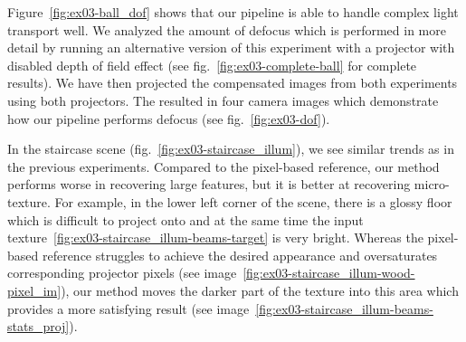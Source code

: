 Figure~\ref{fig:ex03-ball_dof} shows that our pipeline is able to handle complex light transport well. We analyzed the amount of defocus which is performed in more detail by running an alternative version of this experiment with a projector with disabled depth of field effect (see fig.~\ref{fig:ex03-complete-ball} for complete results). We have then projected the compensated images from both experiments using both projectors. The resulted in four camera images which demonstrate how our pipeline performs defocus (see fig.~\ref{fig:ex03-dof}).

In the staircase scene (fig.~\ref{fig:ex03-staircase_illum}), we see similar trends as in the previous experiments. Compared to the pixel-based reference, our method performs worse in recovering large features, but it is better at recovering micro-texture. For example, in the lower left corner of the scene, there is a glossy floor which is difficult to project onto and at the same time the input texture~\ref{fig:ex03-staircase_illum-beams-target} is very bright. Whereas the pixel-based reference struggles to achieve the desired appearance and oversaturates corresponding projector pixels (see image~\ref{fig:ex03-staircase_illum-wood-pixel_im}), our method moves the darker part of the texture into this area which provides a more satisfying result (see image~\ref{fig:ex03-staircase_illum-beams-stats_proj}).